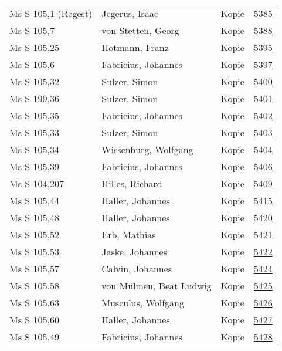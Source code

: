 \documentclass[10pt,a4paper,landscape]{report}
\begin{document}
\begin{longtable}{p{16cm}p{4cm}lr}
Ms S 105,1 (Regest)	&	Jegerus, Isaac	&	Kopie	&	\href{http://130.60.24.72/assignment/5385}{5385}\\
Ms S 105,7	&	von Stetten, Georg	&	Kopie	&	\href{http://130.60.24.72/assignment/5388}{5388}\\
Ms S 105,25	&	Hotmann, Franz	&	Kopie	&	\href{http://130.60.24.72/assignment/5395}{5395}\\
Ms S 105,6	&	Fabricius, Johannes	&	Kopie	&	\href{http://130.60.24.72/assignment/5397}{5397}\\
Ms S 105,32	&	Sulzer, Simon	&	Kopie	&	\href{http://130.60.24.72/assignment/5400}{5400}\\
Ms S 199,36	&	Sulzer, Simon	&	Kopie	&	\href{http://130.60.24.72/assignment/5401}{5401}\\
Ms S 105,35	&	Fabricius, Johannes	&	Kopie	&	\href{http://130.60.24.72/assignment/5402}{5402}\\
Ms S 105,33	&	Sulzer, Simon	&	Kopie	&	\href{http://130.60.24.72/assignment/5403}{5403}\\
Ms S 105,34	&	Wissenburg, Wolfgang	&	Kopie	&	\href{http://130.60.24.72/assignment/5404}{5404}\\
Ms S 105,39	&	Fabricius, Johannes	&	Kopie	&	\href{http://130.60.24.72/assignment/5406}{5406}\\
Ms S 104,207	&	Hilles, Richard	&	Kopie	&	\href{http://130.60.24.72/assignment/5409}{5409}\\
Ms S 105,44	&	Haller, Johannes	&	Kopie	&	\href{http://130.60.24.72/assignment/5415}{5415}\\
Ms S 105,48	&	Haller, Johannes	&	Kopie	&	\href{http://130.60.24.72/assignment/5420}{5420}\\
Ms S 105,52	&	Erb, Mathias	&	Kopie	&	\href{http://130.60.24.72/assignment/5421}{5421}\\
Ms S 105,53	&	Jaske, Johannes	&	Kopie	&	\href{http://130.60.24.72/assignment/5422}{5422}\\
Ms S 105,57	&	Calvin, Johannes	&	Kopie	&	\href{http://130.60.24.72/assignment/5424}{5424}\\
Ms S 105,58	&	von Mülinen, Beat Ludwig	&	Kopie	&	\href{http://130.60.24.72/assignment/5425}{5425}\\
Ms S 105,63	&	Musculus, Wolfgang	&	Kopie	&	\href{http://130.60.24.72/assignment/5426}{5426}\\
Ms S 105,60	&	Haller, Johannes	&	Kopie	&	\href{http://130.60.24.72/assignment/5427}{5427}\\
Ms S 105,49	&	Fabricius, Johannes	&	Kopie	&	\href{http://130.60.24.72/assignment/5428}{5428}\\

\end{longtable}
\end{document}
